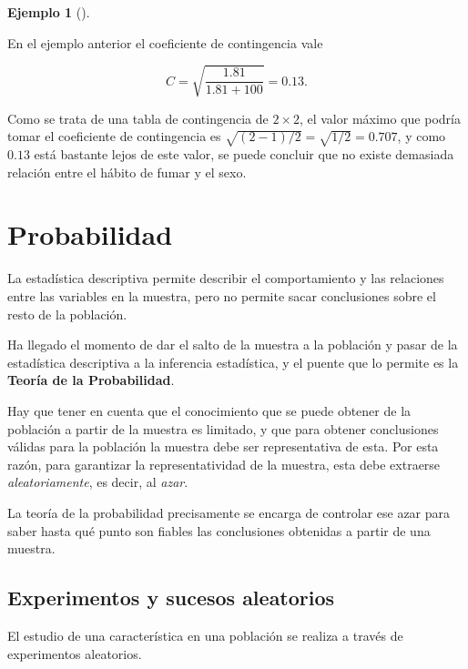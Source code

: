 \documentclass[
  a4paper,
]{scrreport}
\theoremstyle{plain}
\theoremstyle{definition}
\theoremstyle{definition}
\newtheorem{example}{Ejemplo}[chapter]
\theoremstyle{remark}
\begin{document}
\begin{example}[]\protect\hypertarget{exm-coeficiente-contingencia}{}\label{exm-coeficiente-contingencia}

En el ejemplo anterior el coeficiente de contingencia vale

\[
C = \sqrt{\frac{1.81}{1.81+100}} = 0.13.
\]

Como se trata de una tabla de contingencia de \(2\times 2\), el valor
máximo que podría tomar el coeficiente de contingencia es
\(\sqrt{(2-1)/2}=\sqrt{1/2}=0.707\), y como \(0.13\) está bastante lejos
de este valor, se puede concluir que no existe demasiada relación entre
el hábito de fumar y el sexo.

\end{example}


\chapter{Probabilidad}\label{probabilidad}

La estadística descriptiva permite describir el comportamiento y las
relaciones entre las variables en la muestra, pero no permite sacar
conclusiones sobre el resto de la población.

Ha llegado el momento de dar el salto de la muestra a la población y
pasar de la estadística descriptiva a la inferencia estadística, y el
puente que lo permite es la \textbf{Teoría de la Probabilidad}.

Hay que tener en cuenta que el conocimiento que se puede obtener de la
población a partir de la muestra es limitado, y que para obtener
conclusiones válidas para la población la muestra debe ser
representativa de esta. Por esta razón, para garantizar la
representatividad de la muestra, esta debe extraerse
\emph{aleatoriamente}, es decir, al \emph{azar}.

La teoría de la probabilidad precisamente se encarga de controlar ese
azar para saber hasta qué punto son fiables las conclusiones obtenidas a
partir de una muestra.

\section{Experimentos y sucesos
aleatorios}\label{experimentos-y-sucesos-aleatorios}

El estudio de una característica en una población se realiza a través de
experimentos aleatorios.
\end{document}
